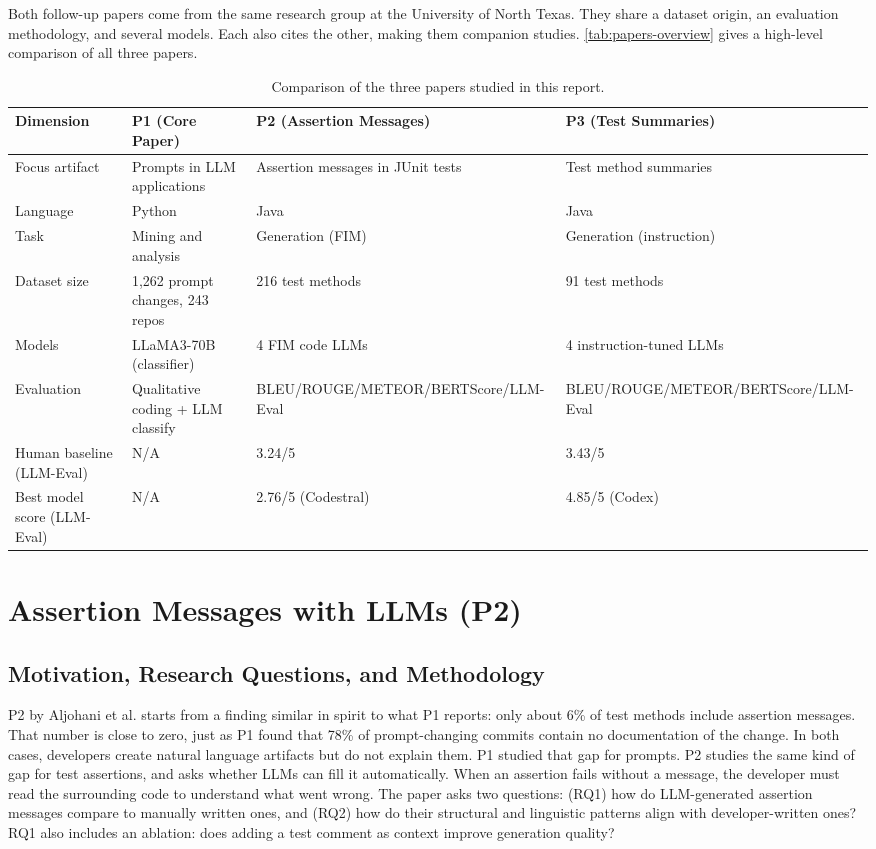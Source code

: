 \documentclass[
    pdftex,
    final,
    11pt,
    a4paper,
    parskip=false,
    oneside,
    footheight=0mm,
    footinclude=false,
    toc=bibliography
]{scrbook}
\begin{document}
Both follow-up papers come from the same research group at the University of North Texas. They share a dataset origin, an evaluation methodology, and several models. Each also cites the other, making them companion studies. \autoref{tab:papers-overview} gives a high-level comparison of all three papers.

\begin{table}[htbp]
\centering
\caption{Comparison of the three papers studied in this report.}
\label{tab:papers-overview}
\small
\begin{tabularx}{\linewidth}{lXXX}
\toprule
\textbf{Dimension} & \textbf{P1 (Core Paper)} & \textbf{P2 (Assertion Messages)} & \textbf{P3 (Test Summaries)} \\
\midrule
Focus artifact & Prompts in LLM applications & Assertion messages in JUnit tests & Test method summaries \\
Language & Python & Java & Java \\
Task & Mining and analysis & Generation (FIM) & Generation (instruction) \\
Dataset size & 1,262 prompt changes, 243 repos & 216 test methods & 91 test methods \\
Models & LLaMA3-70B (classifier) & 4 FIM code LLMs & 4 instruction-tuned LLMs \\
Evaluation & Qualitative coding + LLM classify & BLEU/ROUGE/METEOR/BERTScore/LLM-Eval & BLEU/ROUGE/METEOR/BERTScore/LLM-Eval \\
Human baseline (LLM-Eval) & N/A & 3.24/5 & 3.43/5 \\
Best model score (LLM-Eval) & N/A & 2.76/5 (Codestral) & 4.85/5 (Codex) \\
\bottomrule
\end{tabularx}
\end{table}

\section{Assertion Messages with LLMs (P2)}

\subsection{Motivation, Research Questions, and Methodology}

P2 by Aljohani et al. \cite{Aljohani2025} starts from a finding similar in spirit to what P1 reports: only about 6\% of test methods include assertion messages. That number is close to zero, just as P1 found that 78\% of prompt-changing commits contain no documentation of the change. In both cases, developers create natural language artifacts but do not explain them. P1 studied that gap for prompts. P2 studies the same kind of gap for test assertions, and asks whether LLMs can fill it automatically. When an assertion fails without a message, the developer must read the surrounding code to understand what went wrong. The paper asks two questions: (RQ1) how do LLM-generated assertion messages compare to manually written ones, and (RQ2) how do their structural and linguistic patterns align with developer-written ones? RQ1 also includes an ablation: does adding a test comment as context improve generation quality?
\end{document}
